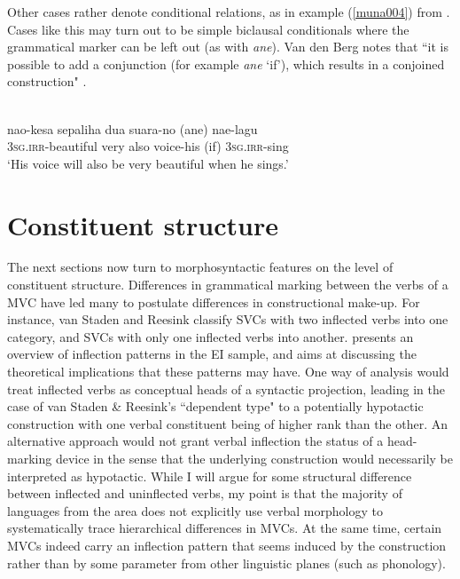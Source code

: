 Other cases rather denote conditional relations, as in example (\ref{muna004}) from . Cases like this may turn out to be simple biclausal conditionals where the grammatical marker can be left out (as with \textit{ane}). Van den Berg notes that ``it is possible to add a conjunction (for example \textit{ane} `if'), which results in a conjoined construction" \citep[235]{vandenberg1989}.

\ea \label{muna004}
\\
\gll nao-kesa sepaliha dua suara-no (ane) nae-lagu \\
3\textsc{sg}.\textsc{irr}-beautiful very also voice-his (if) 3\textsc{sg}.\textsc{irr}-sing \\
\glft `His voice will also be very beautiful when he sings.'\\ 
\z

\section{Constituent structure}

The next sections now turn to morphosyntactic features on the level of constituent structure. Differences in grammatical marking between the verbs of a MVC have led many to postulate differences in constructional make-up. For instance, van Staden and Reesink classify SVCs with two inflected verbs into one category, and SVCs with only one inflected verbs into another.  presents an overview of inflection patterns in the EI sample, and aims at discussing the theoretical implications that these patterns may have. One way of analysis would treat inflected verbs as conceptual heads of a syntactic projection, leading in the case of van Staden \& Reesink's ``dependent type" to a potentially hypotactic construction with one verbal constituent being of higher rank than the other. An alternative approach would not grant verbal inflection the status of a head-marking device in the sense that the underlying construction would necessarily be interpreted as hypotactic. While I will argue for some structural difference between inflected and uninflected verbs, my point is that the majority of languages from the area does not explicitly use verbal morphology to systematically trace hierarchical differences in MVCs. At the same time, certain MVCs indeed carry an inflection pattern that seems induced by the construction rather than by some parameter from other linguistic planes (such as phonology).

